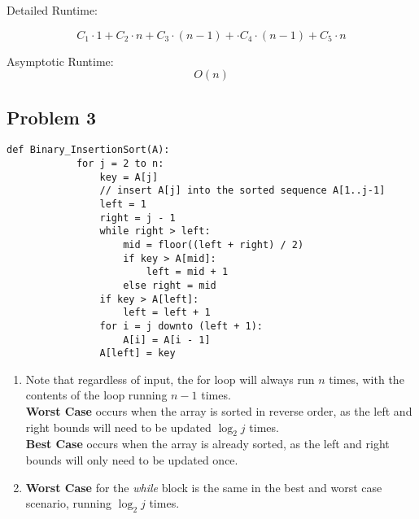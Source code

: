 \documentclass{article}
\begin{document}
Detailed Runtime:

\begin{equation*}
    C_1 \cdot 1 + C_2 \cdot n + C_3 \cdot (n - 1) + \cdot C_4 \cdot (n - 1) + C_5 \cdot n
\end{equation*}

Asymptotic Runtime:
\begin{equation*}
    O(n)
\end{equation*}

\pagebreak

\subsection*{Problem 3}
\begin{lstlisting}[firstnumber=0]
        def Binary_InsertionSort(A):
            for j = 2 to n:
                key = A[j]
                // insert A[j] into the sorted sequence A[1..j-1]
                left = 1
                right = j - 1
                while right > left:
                    mid = floor((left + right) / 2)
                    if key > A[mid]:
                        left = mid + 1
                    else right = mid
                if key > A[left]:
                    left = left + 1
                for i = j downto (left + 1):
                    A[i] = A[i - 1]
                A[left] = key
\end{lstlisting}

\begin{enumerate}
    \item
          Note that regardless of input, the for loop will always run $n$ times, with the contents of the loop running $n - 1$ times. \\
          \textbf{Worst Case} occurs when the array is sorted in reverse order, as the left and right bounds will need to be updated \(\log_2 j\) times.\\
          \textbf{Best Case} occurs when the array is already sorted, as the left and right bounds will only need to be updated once.\\
    \item \textbf{Worst Case} for the \textit{while} block is the same in the best and worst case scenario, running \(\log_2 j\) times.\\
\end{enumerate}
\end{document}
